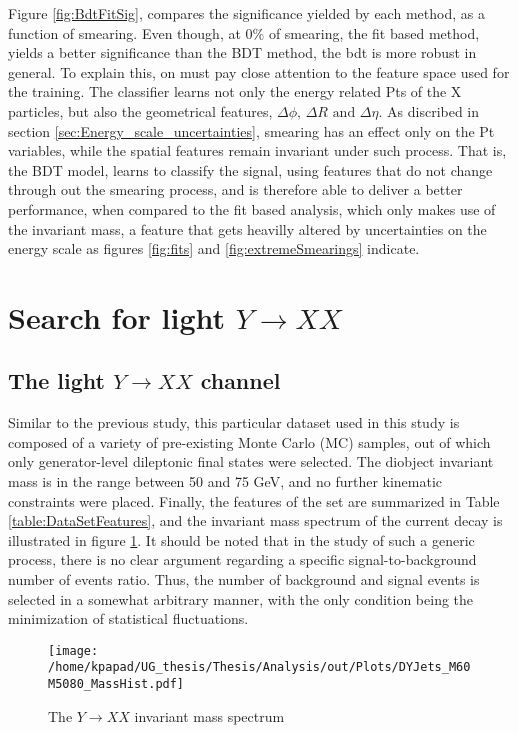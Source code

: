 Figure \ref{fig:BdtFitSig}, compares the significance yielded by each method, as a function of smearing. 
Even though, at \(0\%\) of smearing, the fit based method, yields a better significance than the BDT method, the bdt is more robust in general. To explain this, on must pay close attention to the feature space used for the training. The classifier learns not only the energy related Pts of the X particles, but also the geometrical features, \(\Delta\phi\text{, }\Delta R\text{ and }\Delta\eta\). As discribed in section \ref{sec:Energy_scale_uncertainties}, smearing has an effect only on the Pt variables, while the spatial features remain invariant under such process. That is, the BDT model, learns to classify the signal, using features that do not change through out the smearing process, and is therefore able to deliver a better performance, when compared to the fit based analysis, which only makes use of the invariant mass, a feature that gets heavilly altered by uncertainties on the energy scale as figures \ref{fig:fits} and \ref{fig:extremeSmearings} indicate. 


\section{Search for light \(Y \rightarrow XX\)}
\label{sec:org59adc41}
\subsection{The light \(Y\rightarrow XX\) channel}
\label{sec:orgabd932d}
Similar to the previous study, this particular dataset used in this study is composed of a variety of pre-existing Monte Carlo (MC) samples, out of which only generator-level dileptonic final states were selected. The diobject invariant mass is in the range between 50 and 75 GeV, and no further kinematic constraints were placed. Finally, the features of the set are summarized in Table \ref{table:DataSetFeatures}, and the invariant mass spectrum of the current decay is illustrated in figure \ref{fig:LightMassSpectrum}. It should be noted that in the study of such a generic process, there is no clear argument regarding a specific signal-to-background number of events ratio. Thus, the number of background and signal events is selected in a somewhat arbitrary manner, with the only condition being the minimization of statistical fluctuations.
\begin{figure}[h!]
\centering
\texttt{[image: /home/kpapad/UG\_thesis/Thesis/Analysis/out/Plots/DYJets\_M60M5080\_MassHist.pdf]}
\caption{The $Y\rightarrow XX$ invariant mass spectrum}
\label{fig:LightMassSpectrum}
\end{figure}

